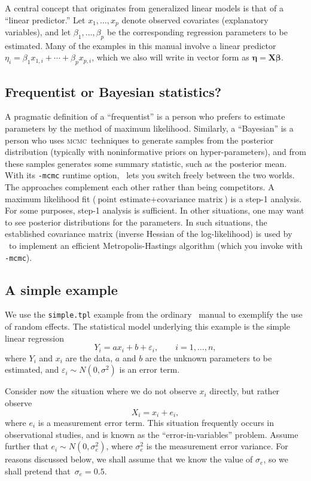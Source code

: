 \documentclass{admbmanual}
\newcommand{\scMCMC}{\textsc{mcmc}}
\begin{document}
A central concept that originates from generalized linear models is that of a
``linear predictor.'' Let $x_{1},\ldots ,x_{p}$ denote observed covariates
(explanatory variables), and let $\beta _{1},\ldots ,\beta _{p}$ be the
corresponding regression parameters to be estimated. Many of the examples in
this manual involve a linear predictor $\eta_{i}=\beta_{1}x_{1,i}+\cdots
+\beta_{p}x_{p,i}$, which we also will write in vector form as
$\mathbf{\eta}=\mathbf{X\beta }$. 

\subsection{Frequentist or Bayesian statistics?}

A pragmatic definition of a ``frequentist'' is a person who prefers to estimate
parameters by the method of maximum likelihood. Similarly, a ``Bayesian'' is a
person who uses \scMCMC\ techniques to generate samples from the posterior
distribution (typically with noninformative priors on hyper-parameters), and
from these samples generates some summary statistic, such as the posterior mean.
With its \texttt{-mcmc} runtime option, \scAB\ lets you switch freely between
the two worlds. The approaches complement each other rather than being
competitors. A maximum likelihood fit ($\textrm{point estimate} +
\textrm{covariance matrix}$) is a step-1 analysis. For some purposes, step-1
analysis is sufficient. In other situations, one may want to see posterior
distributions for the parameters. In such situations, the established covariance
matrix (inverse Hessian of the log-likelihood) is used by \scAB\ to implement an
efficient Metropolis-Hastings algorithm (which you invoke with \texttt{-mcmc}).

\subsection{A simple example}

We use the \texttt{simple.tpl} example from the ordinary \scAB\ manual to
exemplify the use of random effects. The statistical model underlying this
example is the simple linear regression
\[
Y_i=ax_i+b+\varepsilon_i,\qquad i=1,\ldots ,n,
\]
where $Y_i$ and $x_i$ are the data, $a$ and $b$ are the unknown parameters to be
estimated, and $\varepsilon_i\sim N(0,\sigma ^{2})$ is an error term.

Consider now the situation where we do not observe $x_i$ directly, but rather
observe
\[
X_i=x_i+e_i,
\]
where $e_i$ is a measurement error term. This situation frequently occurs in
observational studies, and is known as the ``error-in-variables'' problem.
Assume further that $e_i\sim N(0,\sigma_{e}^{2})$, where $\sigma_{e}^{2}$ is the
measurement error variance. For reasons discussed below, we shall assume that we
know the value of $\sigma_e$, so we shall pretend that~$\sigma_e=0.5$.
\end{document}
